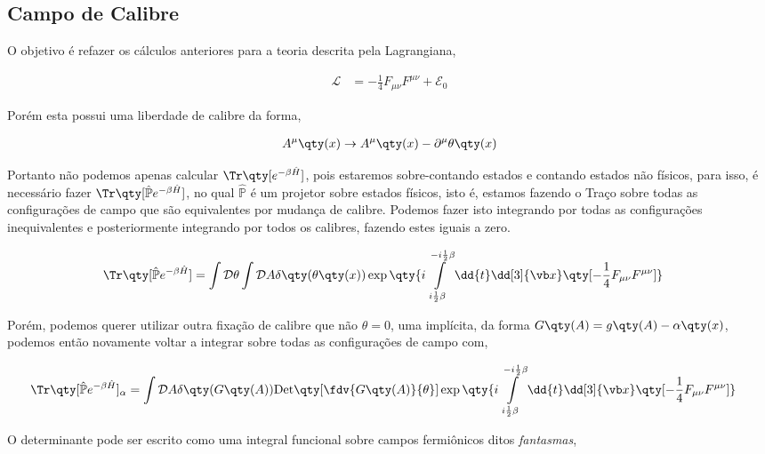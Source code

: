 \documentclass[twoside]{amsart}
\numberwithin{equation}{section}
\newcommand{\Dd}[1]{\mathcal D #1}
\newcommand{\Det}[1]{\textup{Det} #1}
\begin{document}
\begin{refsection}
\section{Campo de Calibre}

O objetivo é refazer os cálculos anteriores para a teoria descrita pela Lagrangiana, 

\begin{align}
    \mathcal L&=-\frac14F_{\mu\nu}F^{\mu\nu}+\mathcal E_0
\end{align}

Porém esta possui uma liberdade de calibre da forma,

\begin{align}
    A^\mu\qty(x)\rightarrow A^\mu\qty(x)-\partial^\mu\theta\qty(x)
\end{align}

Portanto não podemos apenas calcular $\Tr\qty[e^{-\beta\hat H}]$, pois estaremos sobre-contando estados e contando estados não físicos, para isso, é necessário fazer $\Tr\qty[\hat{\mathbb P}e^{-\beta\hat H}]$, no qual $\hat{\mathbb P}$ é um projetor sobre estados físicos, isto é, estamos fazendo o Traço sobre todas as configurações de campo que são equivalentes por mudança de calibre. Podemos fazer isto integrando por todas as configurações inequivalentes e posteriormente integrando por todos os calibres, fazendo estes iguais a zero.

\begin{align}
    \Tr\qty[\hat{\mathbb P}e^{-\beta\hat H}]&=\int\Dd{\theta}\int\Dd{A}\delta\qty(\theta\qty(x))\exp\qty{i\int\limits_{i\frac12\beta}^{-i\frac12\beta}\dd{t}\dd[3]{\vb x}\qty[-\frac14F_{\mu\nu}F^{\mu\nu}]}
\end{align}

Porém, podemos querer utilizar outra fixação de calibre que não $\theta=0$, uma implícita, da forma $G\qty(A)=g\qty(A)-\alpha\qty(x)$, podemos então novamente voltar a integrar sobre todas as configurações de campo com,

\begin{align}
    \Tr\qty[\hat{\mathbb P}e^{-\beta\hat H}]_\alpha&=\int\Dd{A}\delta\qty(G\qty(A))\Det\qty[\fdv{G\qty(A)}{\theta}]\exp\qty{i\int\limits_{i\frac12\beta}^{-i\frac12\beta}\dd{t}\dd[3]{\vb x}\qty[-\frac14F_{\mu\nu}F^{\mu\nu}]}
\end{align}

O determinante pode ser escrito como uma integral funcional sobre campos fermiônicos ditos \emph{fantasmas},


\end{refsection}
\end{document}
